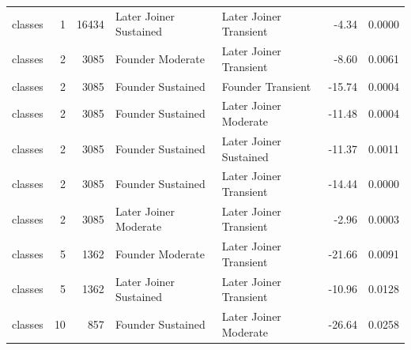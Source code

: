 \begin{table}[H]
{\begin{tabular}{l r r l l r r}
classes & 1 & 16434 & Later Joiner Sustained & Later Joiner Transient & -4.34 & 0.0000 \\ 
classes & 2 & 3085 & Founder Moderate & Later Joiner Transient & -8.60 & 0.0061 \\ 
classes & 2 & 3085 & Founder Sustained & Founder Transient & -15.74 & 0.0004 \\ 
classes & 2 & 3085 & Founder Sustained & Later Joiner Moderate & -11.48 & 0.0004 \\ 
classes & 2 & 3085 & Founder Sustained & Later Joiner Sustained & -11.37 & 0.0011 \\ 
classes & 2 & 3085 & Founder Sustained & Later Joiner Transient & -14.44 & 0.0000 \\ 
classes & 2 & 3085 & Later Joiner Moderate & Later Joiner Transient & -2.96 & 0.0003 \\ 
classes & 5 & 1362 & Founder Moderate & Later Joiner Transient & -21.66 & 0.0091 \\ 
classes & 5 & 1362 & Later Joiner Sustained & Later Joiner Transient & -10.96 & 0.0128 \\ 
classes & 10 & 857 & Founder Sustained & Later Joiner Moderate & -26.64 & 0.0258 \\ 
\bottomrule
\end{tabular}%
} 
\end{table}
\newpage 
